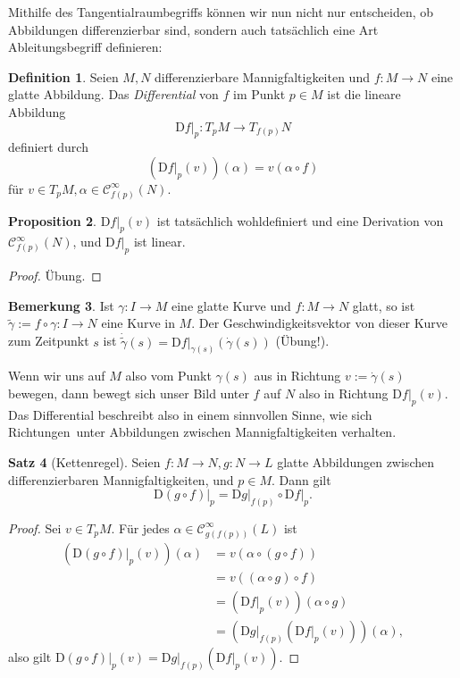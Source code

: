 \documentclass[a4paper]{scrbook}
\numberwithin{equation}{chapter}
\newcommand{\DD}{\mathrm{D}}
\newcommand{\sC}{\mathcal{C}^{\infty}}
\theoremstyle{definition}
\newtheorem{defn}{Definition}[section]
\newtheorem{prop}[defn]{Proposition}
\newtheorem{satz}[defn]{Satz}
\newtheorem{bem}[defn]{Bemerkung}
\newcommand{\bewUeb}{\begin{proof}Übung.\end{proof}}
\begin{document}
Mithilfe des Tangentialraumbegriffs können wir nun nicht nur entscheiden, ob Abbildungen differenzierbar sind, sondern auch tatsächlich eine Art Ableitungsbegriff definieren:
\begin{defn}
	Seien $M,N$ differenzierbare Mannigfaltigkeiten und $f\colon M \to N$ eine glatte Abbildung. Das \emph{Differential} von $f$ im Punkt $p\in M$ ist die lineare Abbildung
	\[\left.\DD f\right|_p \colon T_pM \to T_{f(p)}N\]
	definiert durch
	\[\left(\left.\DD f\right|_p(v)\right)(\alpha) = v (\alpha\circ f)\]
	für $v\in T_pM, \alpha \in \sC_{f(p)}(N)$.
\end{defn}
\begin{prop}
	$\left.\DD f\right|_p(v)$ ist tatsächlich wohldefiniert und eine Derivation von $\sC_{f(p)}(N)$, und $\left.\DD f\right|_p$ ist linear. \bewUeb
\end{prop}

\begin{bem}
	Ist $\gamma\colon I \to M$ eine glatte Kurve und $f\colon M \to N$ glatt, so ist $\tilde\gamma := f\circ\gamma \colon I \to N$ eine Kurve in $M$. Der Geschwindigkeitsvektor von dieser Kurve zum Zeitpunkt $s$ ist $\dot{\tilde\gamma}(s) = \left.\DD f\right|_{\gamma(s)} (\dot\gamma(s))$ (Übung!).
	
	Wenn wir uns auf $M$ also vom Punkt $\gamma(s)$ aus in Richtung $v := \dot\gamma(s)$ bewegen, dann bewegt sich unser Bild unter $f$ auf $N$ also in Richtung $\left.\DD f\right|_p(v)$. Das Differential beschreibt also in einem sinnvollen Sinne, wie sich \glqq Richtungen\grqq\ unter Abbildungen zwischen Mannigfaltigkeiten verhalten.
\end{bem}

\begin{satz}[Kettenregel]
	Seien $f\colon M \to N, g\colon N \to L$ glatte Abbildungen zwischen differenzierbaren Mannigfaltigkeiten, und $p \in M$. Dann gilt \[\left.\DD(g\circ f)\right|_p = \left.\DD g\right|_{f(p)} \circ \left.\DD f\right|_p.\]

	\begin{proof}
		Sei $v \in T_pM$. Für jedes $\alpha \in \sC_{g(f(p))}(L)$ ist
		\begin{align*}
			\left(\left.\DD(g\circ f)\right|_p(v)\right)(\alpha) &= v(\alpha\circ (g \circ f))\\
			&= v((\alpha\circ g) \circ f)\\
			&= \left(\left.\DD f\right|_p(v)\right) (\alpha \circ g)\\
			&= \left(\left.\DD g\right|_{f(p)} \left(\left.\DD f\right|_p(v)\right)\right) (\alpha),
		\end{align*}
		also gilt $\left.\DD(g\circ f)\right|_p(v) = \left.\DD g\right|_{f(p)}\left(\left.\DD f\right|_p(v)\right)$.
	\end{proof}
\end{satz}
\end{document}
